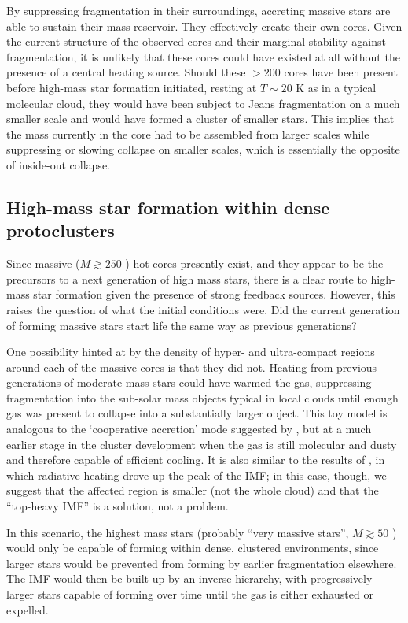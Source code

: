 \documentclass{aa}
\begin{document}
By suppressing fragmentation in their surroundings, accreting massive stars are
able to sustain their mass reservoir.  They effectively create their own cores.
Given the current structure of the observed cores and their marginal stability
against fragmentation, it is unlikely that these cores could have existed at
all without the presence of a central heating source.  Should these $>200$
\msun cores have been present before high-mass star formation initiated,
resting at $T\sim20$ K as in a typical molecular cloud, they would have been
subject to Jeans fragmentation on a much smaller scale and would have formed a
cluster of smaller stars.  This implies that the mass currently in the core had
to be assembled from larger scales while suppressing or slowing collapse on
smaller scales, which is essentially the opposite of inside-out collapse.

\subsection{High-mass star formation within dense protoclusters}
Since massive ($M\gtrsim250$ \msun) hot cores presently exist, and they
appear to be the precursors to a next generation of high mass stars, there
is a clear route to high-mass star formation given the presence of 
strong feedback sources.   However, this raises the question of what
the initial conditions were.  Did the
current generation of forming massive stars start life the same way
as previous generations?

One possibility hinted at by the density of hyper- and ultra-compact \hii
regions around each of the massive cores is that they did not.  Heating from
previous generations of moderate mass stars could have warmed the gas,
suppressing fragmentation into the sub-solar mass objects typical in local
clouds until enough gas was present to collapse into a substantially larger
object.  This toy model is analogous to the `cooperative accretion' mode
suggested by \citet{Zinnecker2007a}, but at a much earlier stage in the cluster
development when the gas is still molecular and dusty and therefore capable of
efficient cooling.  It is also similar to the results of \citet{Krumholz2011a},
in which radiative heating drove up the peak of the IMF; in this case, though,
we suggest that the affected region is smaller (not the whole cloud) and that
the ``top-heavy IMF'' is a solution, not a problem.

In this scenario, the highest mass stars (probably ``very massive stars'',
$M\gtrsim50$ \msun) would only be capable of forming within dense, clustered
environments, since larger stars would be prevented from forming by earlier
fragmentation elsewhere.  The IMF would then be built up by an inverse
hierarchy, with progressively larger stars capable of forming over time until
the gas is either exhausted \citep{Ginsburg2016b} or expelled.
\end{document}
